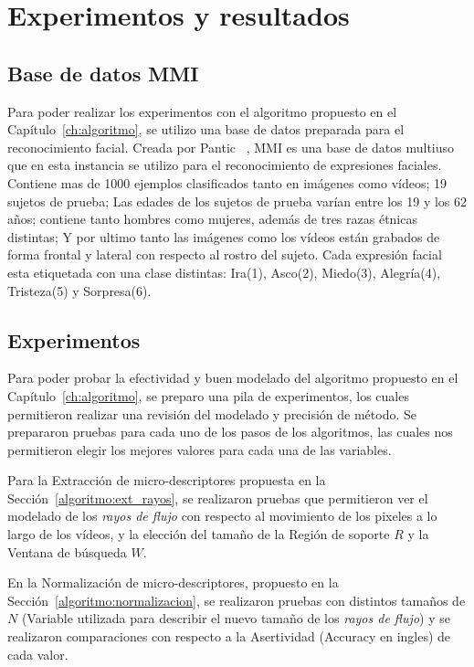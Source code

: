 \chapter[Experimentos y resultados]{Experimentos y resultados}
\label{ch:exp_result}

\section{Base de datos MMI}
\label{exp:bdd}
Para poder realizar los experimentos con el algoritmo propuesto en el Capítulo~\ref{ch:algoritmo}, se utilizo una base de datos preparada para el reconocimiento facial. Creada por Pantic \etal~\cite{Pantic2005}, MMI es una base de datos multiuso que en esta instancia se utilizo para el reconocimiento de expresiones faciales. Contiene mas de 1000 ejemplos clasificados tanto en imágenes como vídeos; 19 sujetos de prueba; Las edades de los sujetos de prueba varían entre los 19 y los 62 años;  contiene tanto hombres como mujeres, además de tres razas étnicas distintas; Y por ultimo tanto las imágenes como los vídeos están grabados de forma frontal y lateral con respecto al rostro del sujeto.
Cada expresión facial esta etiquetada con una clase distintas: Ira(1), Asco(2), Miedo(3), Alegría(4), Tristeza(5) y Sorpresa(6).

\section{Experimentos}

Para poder probar la efectividad y buen modelado del algoritmo propuesto en el Capítulo~\ref{ch:algoritmo}, se preparo una pila de experimentos, los cuales permitieron realizar una revisión del modelado y precisión de método.
Se prepararon pruebas para cada uno de los pasos de los algoritmos, las cuales nos permitieron elegir los mejores valores para cada una de las variables.

Para la Extracción de micro-descriptores propuesta en la Sección~\ref{algoritmo:ext_rayos}, se realizaron pruebas que permitieron ver el modelado de los \textit{rayos de flujo} con respecto al movimiento de los pixeles a lo largo de los vídeos, y la elección del tamaño de la Región de soporte $R$ y la Ventana de búsqueda $W$.

En la Normalización de micro-descriptores, propuesto en la Sección~\ref{algoritmo:normalizacion}, se realizaron pruebas con distintos tamaños de $N$ (Variable utilizada para describir el nuevo tamaño de los \textit{rayos de flujo}) y se realizaron comparaciones con respecto a la Asertividad (Accuracy en ingles) de cada valor.

